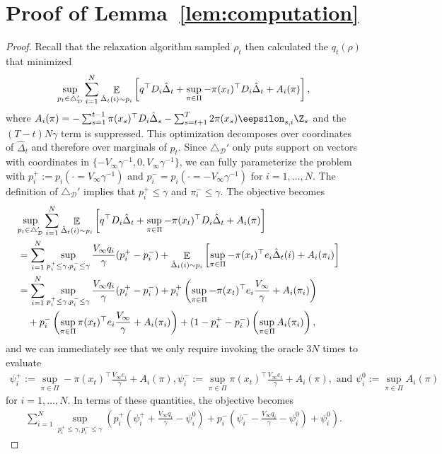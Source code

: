 \documentclass{article}
\newcommand{\exop}{\mathop{\ex}}
\begin{document}
\section{Proof of Lemma~\ref{lem:computation}}
\label{sec:computation.appendix}
\begin{proof}
  Recall that the relaxation algorithm sampled $\rho_t$ then calculated the $q_t(\rho)$ that minimized
 \begin{align*}
    \sup_{p_t\in\triangle_{\mathcal D}'}
    \sum_{i=1}^N
    \exop_{\hat\Delta_t(i) \sim p_i}\left[
    q^\top D_i \hat\Delta_t
    +
    \sup_{\pi\in\Pi}-\pi(x_t)^\top D_i \hat\Delta_t
    +A_i(\pi)\right],
 \end{align*}
where $A_i(\pi) = -\sum_{s=1}^{t-1} \pi(x_s)^\top D_i \hat \Delta_s - \sum_{s=t+1}^T 2\pi(x_s) \eepsilon_{s,i} \Z_{s}$ and the $(T-t)N\gamma$ term is suppressed. This optimization decomposes over coordinates of $\hat\Delta_t$ and therefore over marginals of $p_t$. Since $\triangle_{\mathcal D}'$ only puts support on vectors with coordinates in $\{-V_\infty \gamma^{-1},0,V_\infty \gamma^{-1}\}$,  we can fully parameterize the problem with  $p_i^+ := p_i(\cdot = V_\infty \gamma^{-1})$ and $p_i^- = p_i(\cdot =- V_\infty \gamma^{-1})$ for $i=1,\ldots,N$. The definition of $\triangle_{\mathcal D}'$ implies that $p_i^+\leq\gamma$ and $\pi_i^-\leq\gamma$. The objective becomes
 \begin{align*}
\lefteqn{    \sup_{p_t\in\triangle_{\mathcal D}'}
    \sum_{i=1}^N
    \exop_{\hat\Delta_t(i) \sim p_i}\left[
    q^\top D_i \hat\Delta_t
    +
    \sup_{\pi\in\Pi}-\pi(x_t)^\top D_i \hat\Delta_t
    +A_i(\pi)\right]
}\\
&=
  \sum_{i=1}^N
    \sup_{p_i^+\leq\gamma, p_i^- \leq\gamma}
    \frac{V_\infty q_i}{\gamma} (p_i^+-p_i^-)
    +
    \exop_{\hat\Delta_t(i) \sim p_i}\left[
    \sup_{\pi\in\Pi}-\pi(x_t)^\top e_i\hat\Delta_t(i)
    +A_i(\pi_i)
  \right]\\
&=
  \sum_{i=1}^N
    \sup_{p_i^+\leq\gamma, p_i^- \leq\gamma}
    \frac{V_\infty q_i}{\gamma} (p_i^+-p_i^-)
  +
  p_i^+ \left( \sup_{\pi\in\Pi} -\pi(x_t)^\top e_i\frac{V_\infty}{\gamma}
  +A_i(\pi_i)\right)\\
&\quad +
  p_i^- \left( \sup_{\pi\in\Pi}  \pi(x_t)^\top e_i\frac{V_\infty}{\gamma}
  +A_i(\pi_i)\right)
  +
  (1-p_i^+-p_i^-) \left( \sup_{\pi\in\Pi} A_i(\pi_i)\right),
 \end{align*}
and we can immediately see that we only require invoking the oracle $3N$ times to evaluate
\begin{align*}
  \psi_i^+:= \sup_{\pi\in\Pi}-\pi(x_t)^\top \frac{V_\infty e_i}{\gamma}
  +A_i(\pi),
  \psi_i^-:= \sup_{\pi\in\Pi}\pi(x_t)^\top \frac{V_\infty e_i}{\gamma}
  +A_i(\pi), \text{ and }
  \psi_i^0:= \sup_{\pi\in\Pi} A_i(\pi)
\end{align*}
for $i=1,\ldots, N$. In terms of these quantities, the objective becomes
\begin{align}
  \sum_{i=1}^N
      \sup_{p_i^+\leq\gamma, p_i^- \leq\gamma}
  \left(
  p_i^+\left(\psi_i^+ + \frac{V_\infty q_i}{\gamma} - \psi_i^0\right)
  +
    p_i^-\left(\psi_i^- - \frac{V_\infty q_i}{\gamma} - \psi_i^0\right)
  + \psi_i^0
     \right).
       \label{eqn:sup.with.p}
\end{align}


\end{proof}
\end{document}
